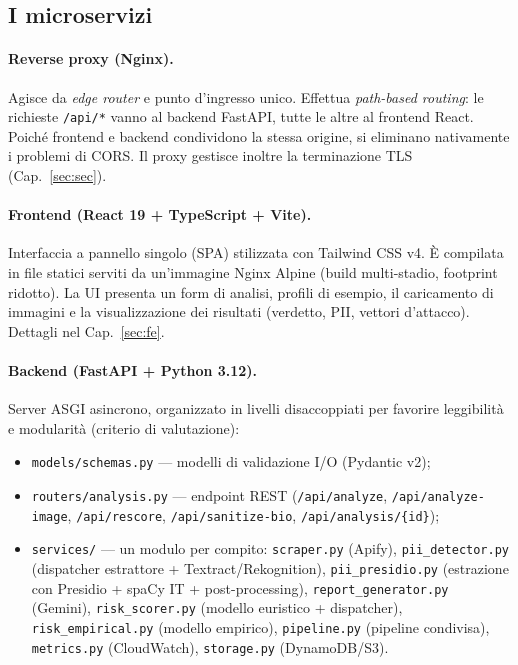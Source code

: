 \documentclass[11pt,a4paper]{article}
\begin{document}
\FloatBarrier
\subsection{I microservizi}
\paragraph{Reverse proxy (Nginx).} Agisce da \emph{edge router} e punto d'ingresso
unico. Effettua \emph{path-based routing}: le richieste \texttt{/api/*} vanno al
backend FastAPI, tutte le altre al frontend React. Poiché frontend e backend
condividono la stessa origine, si eliminano nativamente i problemi di CORS. Il proxy
gestisce inoltre la terminazione TLS (Cap.~\ref{sec:sec}).

\paragraph{Frontend (React 19 + TypeScript + Vite).} Interfaccia a pannello singolo
(SPA) stilizzata con Tailwind CSS v4. È compilata in file statici serviti da
un'immagine Nginx Alpine (build multi-stadio, footprint ridotto). La UI presenta un
form di analisi, profili di esempio, il caricamento di immagini e la
visualizzazione dei risultati (verdetto, PII, vettori d'attacco). Dettagli nel
Cap.~\ref{sec:fe}.

\paragraph{Backend (FastAPI + Python 3.12).} Server ASGI asincrono, organizzato in
livelli disaccoppiati per favorire leggibilità e modularità (criterio di
valutazione):
\begin{itemize}[nosep]
  \item \texttt{models/schemas.py} — modelli di validazione I/O (Pydantic v2);
  \item \texttt{routers/analysis.py} — endpoint REST (\texttt{/api/analyze},
        \texttt{/api/analyze-image}, \texttt{/api/rescore}, \texttt{/api/sanitize-bio},
        \texttt{/api/analysis/\{id\}});
  \item \texttt{services/} — un modulo per compito: \texttt{scraper.py} (Apify),
        \texttt{pii\_detector.py} (dispatcher estrattore + Textract/Rekognition),
        \texttt{pii\_presidio.py} (estrazione con Presidio + spaCy IT + post-processing),
        \texttt{report\_generator.py} (Gemini), \texttt{risk\_scorer.py} (modello euristico +
        dispatcher), \texttt{risk\_empirical.py} (modello empirico), \texttt{pipeline.py}
        (pipeline condivisa), \texttt{metrics.py} (CloudWatch), \texttt{storage.py} (DynamoDB/S3).
\end{itemize}
\end{document}
